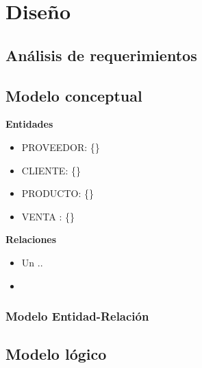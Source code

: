 \documentclass[12pt,letterpaper]{article}
\begin{document}
	\section{Diseño}
		\subsection{Análisis de requerimientos}
		
		\subsection{Modelo conceptual}
			\textbf{Entidades}\par 
			\begin{itemize}
				\item PROVEEDOR: \{\}
				\item CLIENTE: \{\}
				\item PRODUCTO: \{\}
				\item VENTA : \{\}
			\end{itemize}
		
			\textbf{Relaciones}\par
			\begin{itemize}
				\item Un ..
				\item 
			\end{itemize}
			\subsubsection{Modelo Entidad-Relación}
			
		\subsection{Modelo lógico}
\end{document}
